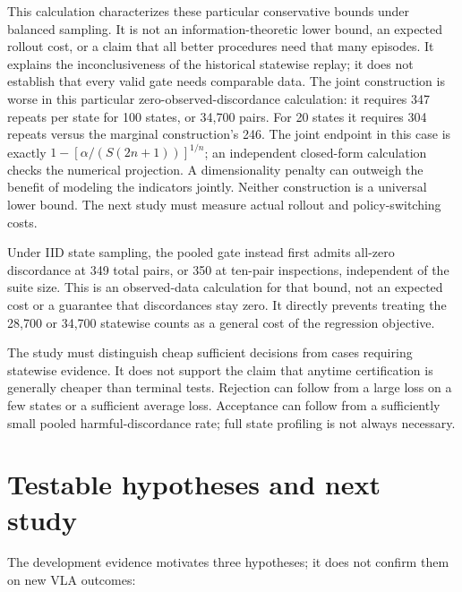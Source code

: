\documentclass[conference]{IEEEtran}
\begin{document}
This calculation characterizes these particular conservative bounds under balanced sampling. It is not an information-theoretic lower bound, an expected rollout cost, or a claim that all better procedures need that many episodes. It explains the inconclusiveness of the historical statewise replay; it does not establish that every valid gate needs comparable data. The joint construction is worse in this particular zero-observed-discordance calculation: it requires 347 repeats per state for 100 states, or 34,700 pairs. For 20 states it requires 304 repeats versus the marginal construction's 246. The joint endpoint in this case is exactly $1-[\alpha/(S(2n+1))]^{1/n}$; an independent closed-form calculation checks the numerical projection. A dimensionality penalty can outweigh the benefit of modeling the indicators jointly. Neither construction is a universal lower bound. The next study must measure actual rollout and policy-switching costs.

Under IID state sampling, the pooled gate instead first admits all-zero discordance at 349 total pairs, or 350 at ten-pair inspections, independent of the suite size. This is an observed-data calculation for that bound, not an expected cost or a guarantee that discordances stay zero. It directly prevents treating the 28,700 or 34,700 statewise counts as a general cost of the regression objective.

The study must distinguish cheap sufficient decisions from cases requiring statewise evidence. It does not support the claim that anytime certification is generally cheaper than terminal tests. Rejection can follow from a large loss on a few states or a sufficient average loss. Acceptance can follow from a sufficiently small pooled harmful-discordance rate; full state profiling is not always necessary.

\section{Testable hypotheses and next study}

The development evidence motivates three hypotheses; it does not confirm them on new VLA outcomes:
\end{document}
